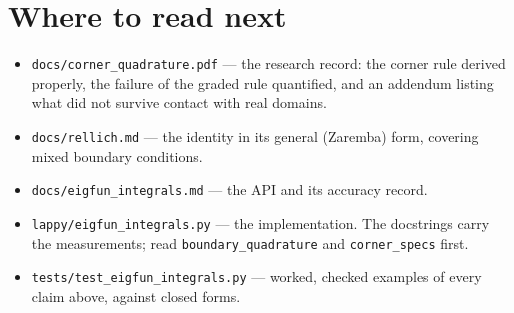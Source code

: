 \documentclass[11pt]{article}
\theoremstyle{definition}
\theoremstyle{remark}
\newcommand{\code}[1]{\texttt{#1}}
\begin{document}
\section*{Where to read next}

\begin{itemize}
\item \code{docs/corner\_quadrature.pdf} --- the research record: the corner rule
      derived properly, the failure of the graded rule quantified, and an
      addendum listing what did not survive contact with real domains.
\item \code{docs/rellich.md} --- the identity in its general (Zaremba) form,
      covering mixed boundary conditions.
\item \code{docs/eigfun\_integrals.md} --- the API and its accuracy record.
\item \code{lappy/eigfun\_integrals.py} --- the implementation. The docstrings
      carry the measurements; read \code{boundary\_quadrature} and
      \code{corner\_specs} first.
\item \code{tests/test\_eigfun\_integrals.py} --- worked, checked examples of
      every claim above, against closed forms.
\end{itemize}
\end{document}
